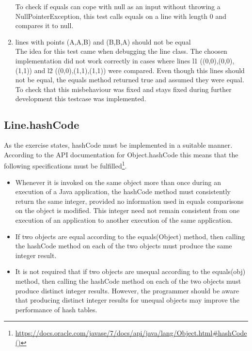 \begin{enumerate}
    To check if equals can cope with null as an input without throwing a NullPointerException, this test calls equals on a line with length 0 and compares it to null.
    \item lines with points (A,A,B) and (B,B,A) should not be equal \\
    The idea for this test came when debugging the line class. The choosen implementation did not work correctly in cases where lines l1 ((0,0),(0,0),(1,1)) and l2 ((0,0),(1,1),(1,1)) were compared. Even though this lines should not be equal, the equals method returned true and assumed they were equal. To check that this misbehaviour was fixed and stays fixed during further development this testcase was implemented.
\end{enumerate}

\subsection{Line.hashCode}
As the exercise states, hashCode must be implemented in a suitable manner. According to the API documentation for Object.hashCode this means that the following specifications must be fulfilled\footnote{\url{https://docs.oracle.com/javase/7/docs/api/java/lang/Object.html#hashCode()}}.
\begin{itemize}
    \item Whenever it is invoked on the same object more than once during an execution of a Java application, the hashCode method must consistently return the same integer, provided no information used in equals comparisons on the object is modified. This integer need not remain consistent from one execution of an application to another execution of the same application.
    \item If two objects are equal according to the equals(Object) method, then calling the hashCode method on each of the two objects must produce the same integer result.
    \item It is not required that if two objects are unequal according to the equals(obj) method, then calling the hashCode method on each of the two objects must produce distinct integer results. However, the programmer should be aware that producing distinct integer results for unequal objects may improve the performance of hash tables.
\end{itemize}

